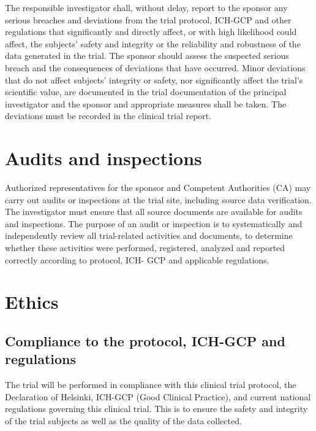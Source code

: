 \documentclass[
]{scrartcl}
\begin{document}
The responsible investigator shall, without delay, report to the sponsor
any serious breaches and deviations from the trial protocol, ICH-GCP and
other regulations that significantly and directly affect, or with high
likelihood could affect, the subjects' safety and integrity or the
reliability and robustness of the data generated in the trial. The
sponsor should assess the suspected serious breach and the consequences
of deviations that have occurred. Minor deviations that do not affect
subjects' integrity or safety, nor significantly affect the trial's
scientific value, are documented in the trial documentation of the
principal investigator and the sponsor and appropriate measures shall be
taken. The deviations must be recorded in the clinical trial report.

\hypertarget{audits-and-inspections}{%
\section{Audits and inspections}\label{audits-and-inspections}}

Authorized representatives for the sponsor and Competent Authorities
(CA) may carry out audits or inspections at the trial site, including
source data verification. The investigator must ensure that all source
documents are available for audits and inspections. The purpose of an
audit or inspection is to systematically and independently review all
trial-related activities and documents, to determine whether these
activities were performed, registered, analyzed and reported correctly
according to protocol, ICH- GCP and applicable regulations.

\hypertarget{ethics}{%
\section{Ethics}\label{ethics}}

\hypertarget{compliance-to-the-protocol-ich-gcp-and-regulations}{%
\subsection{Compliance to the protocol, ICH-GCP and
regulations}\label{compliance-to-the-protocol-ich-gcp-and-regulations}}

The trial will be performed in compliance with this clinical trial
protocol, the Declaration of Helsinki, ICH-GCP (Good Clinical Practice),
and current national regulations governing this clinical trial. This is
to ensure the safety and integrity of the trial subjects as well as the
quality of the data collected.
\end{document}
